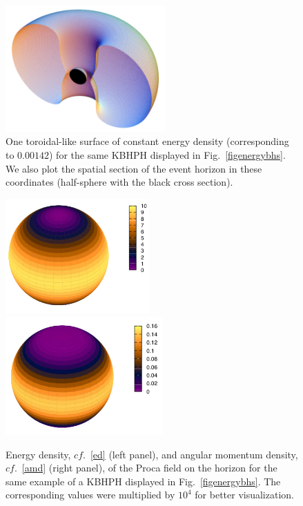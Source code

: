 \begin{figure}[h!]
  \begin{center}
    \includegraphics[width=6.1cm]{papers/Proca/3Dbh.pdf}
  \end{center}
  \caption{One toroidal-like surface of constant energy density (corresponding to $0.00142$) for the same KBHPH displayed in Fig.~\ref{figenergybhs}. We also plot the spatial section of the event horizon in these coordinates (half-sphere with the black cross section).}
  \label{fig3Dbh}
\end{figure}


\begin{figure}[h!]
  \begin{center}
    \includegraphics[width=5.5cm]{papers/Proca/Ttr-horizon.pdf}\qquad \qquad 
      \includegraphics[width=6.0cm]{papers/Proca/T34-horizon.pdf}
  \end{center}
  \caption{Energy density, $cf.$~\eqref{ed} (left panel), and angular momentum density, $cf.$~\eqref{amd}  (right panel),  of the Proca field on the horizon for the same example of a KBHPH displayed in Fig.~\ref{figenergybhs}. The corresponding values were multiplied by $10^4$ for better visualization.}
  \label{horizoned}
\end{figure}


